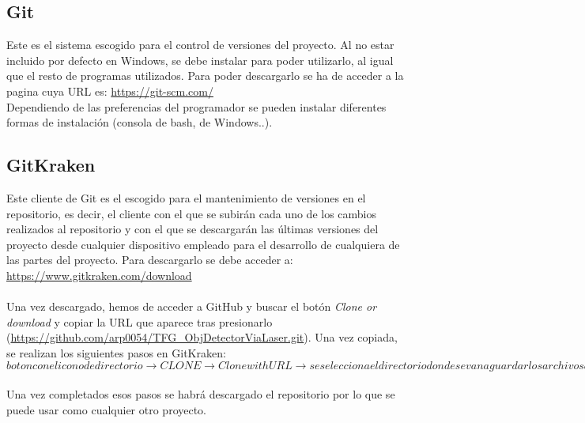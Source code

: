 \subsection{Git}
Este es el sistema escogido para el control de versiones del proyecto. Al no estar incluido por defecto en Windows, se debe instalar para poder utilizarlo, al igual que el resto de programas utilizados. Para poder descargarlo se ha de acceder a la pagina cuya URL es: \url{https://git-scm.com/}\\
Dependiendo de las preferencias del programador se pueden instalar diferentes formas de instalación (consola de bash, de Windows..).

\subsection{GitKraken}
Este cliente de Git es el escogido para el mantenimiento de versiones en el repositorio, es decir, el cliente con el que se subirán cada uno de los cambios realizados al repositorio y con el  que se descargarán las últimas versiones del proyecto desde cualquier dispositivo empleado para el desarrollo de cualquiera de las partes del proyecto. Para descargarlo se debe acceder a: \url{https://www.gitkraken.com/download}\\
\\
Una vez descargado, hemos de acceder a GitHub y buscar el botón \textit{Clone or download} y copiar la URL que aparece tras presionarlo (\url{https://github.com/arp0054/TFG_ObjDetectorViaLaser.git}). Una vez copiada, se realizan los siguientes pasos en GitKraken: $boton con el icono de directorio \rightarrow CLONE \rightarrow Clone with URL \rightarrow se selecciona el directorio donde se van a guardar los archivos del directorio en el PC \rightarrow se pega la URL previamente copiada \rightarrow Clone repo! $\\
\\
Una vez completados esos pasos se habrá descargado el repositorio por lo que se puede usar como cualquier otro proyecto.\\

